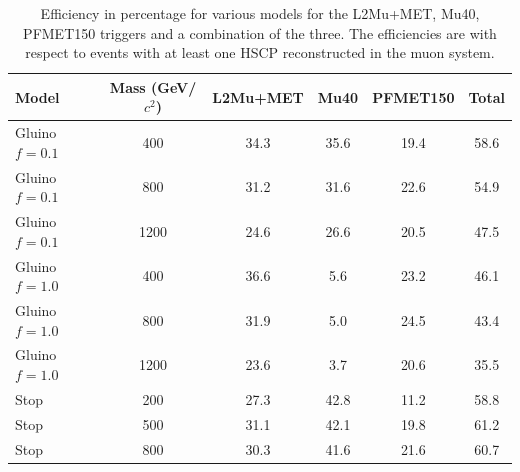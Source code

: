 \begin{table}
 \begin{center}
  \caption[Trigger efficiency for various models considered with respect to events with a reconstructed HSCP in the muon system]
{Efficiency in percentage for various models for the L2Mu+MET, Mu40, PFMET150 triggers and a combination of the three.
The efficiencies are with respect to events with at least one HSCP reconstructed in the muon system.}
     \label{tab:triggEffSA}
  \begin{tabular}{|l|c|c|c|c|c|} \hline
      Model     & Mass (GeV/$c^2$) &L2Mu+MET & Mu40       & PFMET150   & Total   \\ \hline
 Gluino $f=0.1$ &  400       & 34.3    & 35.6       & 19.4       & 58.6    \\
 Gluino $f=0.1$ &  800       & 31.2    & 31.6       & 22.6       & 54.9    \\
 Gluino $f=0.1$ & 1200       & 24.6    & 26.6       & 20.5       & 47.5    \\
 Gluino $f=1.0$ &  400       & 36.6    & 5.6        & 23.2       & 46.1    \\
 Gluino $f=1.0$ &  800       & 31.9    & 5.0        & 24.5       & 43.4    \\
 Gluino $f=1.0$ & 1200       & 23.6    & 3.7        & 20.6       & 35.5    \\
           Stop &  200       & 27.3    & 42.8       & 11.2       & 58.8    \\
           Stop &  500       & 31.1    & 42.1       & 19.8       & 61.2    \\
           Stop &  800       & 30.3    & 41.6       & 21.6       & 60.7    \\ \hline
  \end{tabular}
 \end{center}
\end{table}


